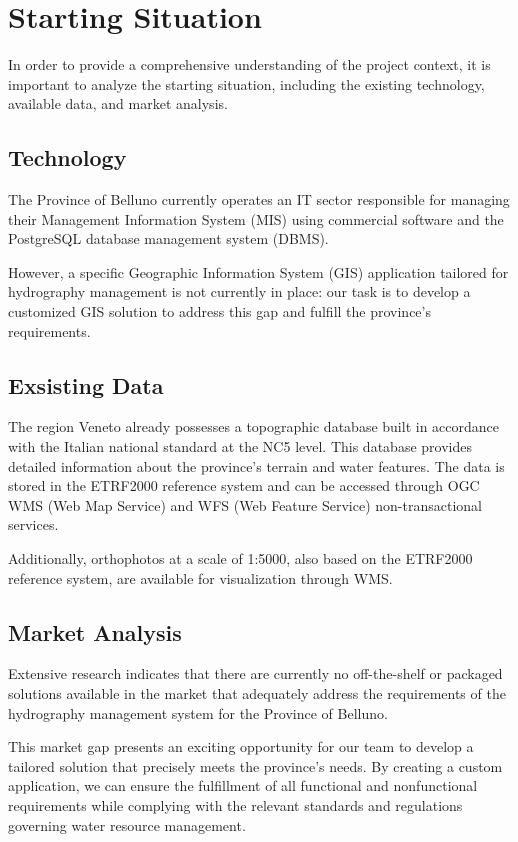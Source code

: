 \section{Starting Situation}
\label{sec:starting_situation}

In order to provide a comprehensive understanding of the project context, it is important to analyze the starting situation, including the existing technology, available data, and market analysis.

\subsection{Technology} The Province of Belluno currently operates an IT sector responsible for managing their Management Information System (MIS) using commercial software and the PostgreSQL database management system (DBMS). 
                        
                        However, a specific Geographic Information System (GIS) application tailored for hydrography management is not currently in place: our task is to develop a customized GIS solution to address this gap and fulfill the province's requirements.

\subsection{Exsisting Data} The region Veneto already possesses a topographic database built in accordance with the Italian national standard at the NC5 level. This database provides detailed information about the province's terrain and water features. The data is stored in the ETRF2000 reference system and can be accessed through OGC WMS (Web Map Service) and WFS (Web Feature Service) non-transactional services. 
                            
Additionally, orthophotos at a scale of 1:5000, also based on the ETRF2000 reference system, are available for visualization through WMS.

\subsection{Market Analysis} Extensive research indicates that there are currently no off-the-shelf or packaged solutions available in the market that adequately address the requirements of the hydrography management system for the Province of Belluno. 

                            This market gap presents an exciting opportunity for our team to develop a tailored solution that precisely meets the province's needs. By creating a custom application, we can ensure the fulfillment of all functional and nonfunctional requirements while complying with the relevant standards and regulations governing water resource management.

